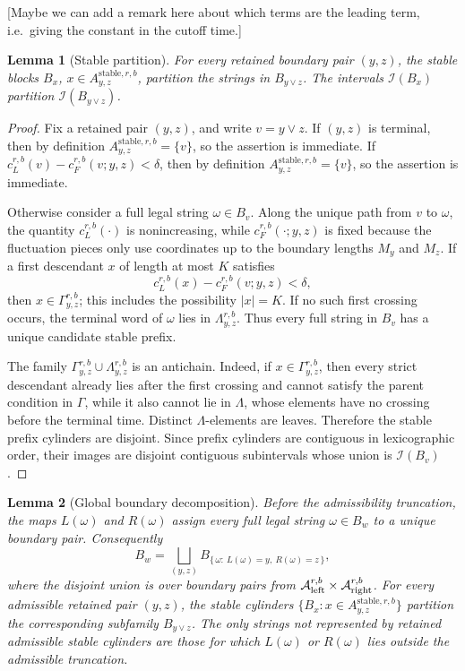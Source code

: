\documentclass[11pt]{article}
\newtheorem{lem}{Lemma}
\newcommand{\cA}{\mathcal A}
\newcommand{\cI}{\mathcal I}
\newcommand{\stable}{\mathrm{stable}}
\newcommand{\jscomment}[1]{\textup{\textsf{\color{blue}[#1]}}}
\begin{document}
\jscomment{Maybe we can add a remark here about which terms are the leading term, i.e.\ giving the constant in the cutoff time.}

\begin{lem}[Stable partition]
For every retained boundary pair \((y,z)\), the stable blocks \(B_x\),
\(x\in A_{y,z}^{\stable,r,b}\), partition the strings in
\(B_{y\vee z}\). The intervals \(\cI(B_x)\) partition
\(\cI(B_{y\vee z})\).
\end{lem}

\begin{proof}
Fix a retained pair \((y,z)\), and write \(v=y\vee z\). If
\((y,z)\) is terminal, then by definition
\(A_{y,z}^{\stable,r,b}=\{v\}\), so the assertion is immediate. If
\(c_L^{r,b}(v)-c_F^{r,b}(v;y,z)<\delta\), then by definition
\(A_{y,z}^{\stable,r,b}=\{v\}\), so the assertion is immediate.

Otherwise consider a full legal string \(\omega\in B_v\). Along the
unique path from \(v\) to \(\omega\), the quantity \(c_L^{r,b}(\cdot)\)
is nonincreasing, while \(c_F^{r,b}(\cdot;y,z)\) is fixed because the
fluctuation pieces only use coordinates up to the boundary lengths
\(M_y\) and \(M_z\). If a first descendant \(x\) of length at most \(K\)
satisfies
\[
    c_L^{r,b}(x)-c_F^{r,b}(v;y,z)<\delta,
\]
then \(x\in\Gamma_{y,z}^{r,b}\); this includes the possibility
\(|x|=K\). If no such first crossing occurs, the terminal word of
\(\omega\) lies in \(\Lambda_{y,z}^{r,b}\). Thus every full string in
\(B_v\) has a unique candidate stable prefix.

The family \(\Gamma_{y,z}^{r,b}\cup\Lambda_{y,z}^{r,b}\) is an
antichain. Indeed, if \(x\in\Gamma_{y,z}^{r,b}\), then every strict
descendant already lies after the first crossing and cannot satisfy the
parent condition in \(\Gamma\), while it also cannot lie in
\(\Lambda\), whose elements have no crossing before the terminal time.
Distinct \(\Lambda\)-elements are leaves. Therefore the stable prefix
cylinders are disjoint. Since prefix cylinders are contiguous in
lexicographic order, their images are disjoint contiguous subintervals
whose union is \(\cI(B_v)\).
\end{proof}

\begin{lem}[Global boundary decomposition]
Before the admissibility truncation, the maps \(L(\omega)\) and
\(R(\omega)\) assign every full legal string \(\omega\in B_w\) to a
unique boundary pair. Consequently
\[
    B_w=
    \bigsqcup_{(y,z)}
    B_{\{\,\omega:\ L(\omega)=y,\ R(\omega)=z\,\}},
\]
where the disjoint union is over boundary pairs from
\(\cA_{\rm left}^{r,b}\times\cA_{\rm right}^{r,b}\). For every admissible
retained pair \((y,z)\), the stable cylinders
\(\{B_x:x\in A_{y,z}^{\stable,r,b}\}\) partition the corresponding
subfamily \(B_{y\vee z}\). The only strings not represented by retained
admissible stable cylinders are those for which \(L(\omega)\) or
\(R(\omega)\) lies outside the admissible truncation.
\end{lem}
\end{document}
